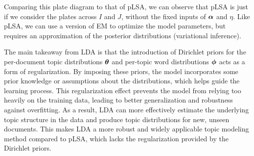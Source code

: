\documentclass[12pt,letterpaper]{article}
\newtheorem{exercise}{Exercise}
\begin{document}
Comparing this plate diagram to that of pLSA, we can observe that pLSA is just if we consider the plates across $I$ and $J$, without the fixed inputs of $\boldsymbol{\alpha}$ and $\eta$. Like pLSA, we can use a version of EM to optimize the model parameters, but requires an approximation of the posterior distributions (variational inference).

The main takeaway from LDA is that the introduction of Dirichlet priors for the per-document topic distributions $\boldsymbol{\theta}$ and per-topic word distributions $\boldsymbol{\phi}$ acts as a form of regularization. By imposing these priors, the model incorporates some prior knowledge or assumptions about the distributions, which helps guide the learning process. This regularization effect prevents the model from relying too heavily on the training data, leading to better generalization and robustness against overfitting. As a result, LDA can more effectively estimate the underlying topic structure in the data and produce topic distributions for new, unseen documents. This makes LDA a more robust and widely applicable topic modeling method compared to pLSA, which lacks the regularization provided by the Dirichlet priors.

\end{document}
